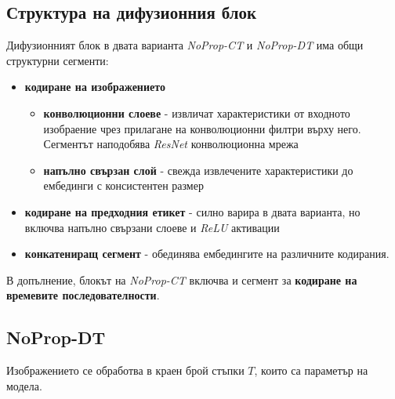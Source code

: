 \documentclass[a4paper,11pt]{article}
\begin{document}
\subsection{Структура на дифузионния блок}
Дифузионният блок в двата варианта \emph{NoProp-CT} и \emph{NoProp-DT} има общи структурни сегменти:
\begin{itemize}
    \item\textbf {кодиране на изображението}
    \begin{itemize}
        \item\textbf{конволюционни слоеве} - извличат характеристики от входното изобраение чрез прилагане на конволюционни филтри върху него. Сегментът наподобява \emph{ResNet} конволюционна мрежа
        \item \textbf{напълно свързан слой} - свежда извлечените характеристики до ембединги с консистентен размер
    \end{itemize}
    \item\textbf{кодиране на предходния етикет} - силно варира в двата варианта, но включва напълно свързани слоеве и \emph{ReLU} активации
    \item\textbf{конкатениращ сегмент} - обединява ембедингите на различните кодирания.
\end{itemize}

В допълнение, блокът на \emph{NoProp-CT} включва и сегмент за \textbf{кодиране на времевите последователности}. 

\subsection{NoProp-DT}
Изображението се обработва в краен брой стъпки $T$, които са параметър на модела.  
\end{document}
